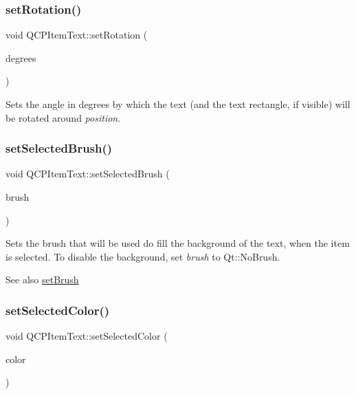 \subsubsection{\texorpdfstring{setRotation()}{setRotation()}}
{\footnotesize\ttfamily void Q\+C\+P\+Item\+Text\+::set\+Rotation (\begin{DoxyParamCaption}\item[{double}]{degrees }\end{DoxyParamCaption})}

Sets the angle in degrees by which the text (and the text rectangle, if visible) will be rotated around {\itshape position}. \mbox{\label{class_q_c_p_item_text_a6b8377eeb2af75eb9528422671ac16cb}} 
\subsubsection{\texorpdfstring{setSelectedBrush()}{setSelectedBrush()}}
{\footnotesize\ttfamily void Q\+C\+P\+Item\+Text\+::set\+Selected\+Brush (\begin{DoxyParamCaption}\item[{const Q\+Brush \&}]{brush }\end{DoxyParamCaption})}

Sets the brush that will be used do fill the background of the text, when the item is selected. To disable the background, set {\itshape brush} to Qt\+::\+No\+Brush.

\begin{DoxySeeAlso}{See also}
\mbox{\hyperlink{class_q_c_p_item_text_a1c7e131516df2ed8d941ef31240ded8e}{set\+Brush}} 
\end{DoxySeeAlso}
\mbox{\label{class_q_c_p_item_text_ae7ba0bdb75c897b028388e45bfd435fa}} 
\subsubsection{\texorpdfstring{setSelectedColor()}{setSelectedColor()}}
{\footnotesize\ttfamily void Q\+C\+P\+Item\+Text\+::set\+Selected\+Color (\begin{DoxyParamCaption}\item[{const Q\+Color \&}]{color }\end{DoxyParamCaption})}

